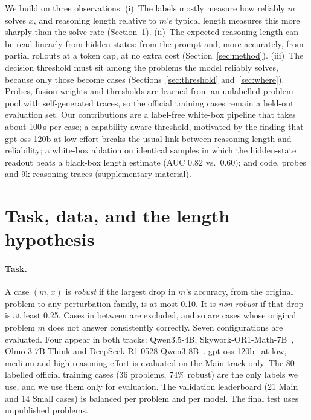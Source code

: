 \documentclass{article}
\begin{document}
We build on three observations.
(i)~The labels mostly measure how reliably $m$ solves $x$, and reasoning length relative to $m$'s typical length measures this more sharply than the solve rate (Section~\ref{sec:data}).
(ii)~The expected reasoning length can be read linearly from hidden states: from the prompt and, more accurately, from partial rollouts at a token cap, at no extra cost (Section~\ref{sec:method}).
(iii)~The decision threshold must sit among the problems the model reliably solves, because only those become cases (Sections~\ref{sec:threshold} and~\ref{sec:where}).
Probes, fusion weights and thresholds are learned from an unlabelled problem pool with self-generated traces, so the official training cases remain a held-out evaluation set.
Our contributions are a label-free white-box pipeline that takes about 100\,s per case; a capability-aware threshold, motivated by the finding that gpt-oss-120b at low effort breaks the usual link between reasoning length and reliability; a white-box ablation on identical samples in which the hidden-state readout beats a black-box length estimate (AUC 0.82 vs.\ 0.60); and code, probes and 9k reasoning traces (supplementary material).

\section{Task, data, and the length hypothesis}
\label{sec:data}

\paragraph{Task.}
A case $(m,x)$ is \emph{robust} if the largest drop in $m$'s accuracy, from the original problem to any perturbation family, is at most 0.10. It is \emph{non-robust} if that drop is at least 0.25.
Cases in between are excluded, and so are cases whose original problem $m$ does not answer consistently correctly.
Seven configurations are evaluated.
Four appear in both tracks: Qwen3.5-4B, Skywork-OR1-Math-7B~\citep{he2025skywork}, Olmo-3-7B-Think and DeepSeek-R1-0528-Qwen3-8B~\citep{deepseek2025r1}.
gpt-oss-120b~\citep{openai2025gptoss} at low, medium and high reasoning effort is evaluated on the Main track only.
The 80 labelled official training cases (36 problems, 74\% robust) are the only labels we use, and we use them only for evaluation.
The validation leaderboard (21 Main and 14 Small cases) is balanced per problem and per model. The final test uses unpublished problems.
\end{document}
